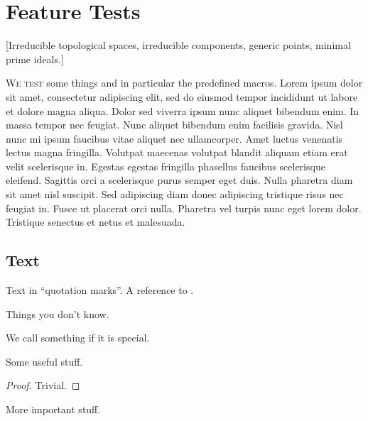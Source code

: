 \chapter{Feature Tests}

[Irreducible topological spaces, irreducible components, generic points, minimal prime ideals.]

\lettrine{W}{e test} some things and in particular the predefined macros.
Lorem ipsum dolor sit amet, consectetur adipiscing elit, sed do eiusmod tempor incididunt ut labore et dolore magna aliqua. Dolor sed viverra ipsum nunc aliquet bibendum enim. In massa tempor nec feugiat. Nunc aliquet bibendum enim facilisis gravida. Nisl nunc mi ipsum faucibus vitae aliquet nec ullamcorper. Amet luctus venenatis lectus magna fringilla. Volutpat maecenas volutpat blandit aliquam etiam erat velit scelerisque in. Egestas egestas fringilla phasellus faucibus scelerisque eleifend. Sagittis orci a scelerisque purus semper eget duis. Nulla pharetra diam sit amet nisl suscipit. Sed adipiscing diam donec adipiscing tristique risus nec feugiat in. Fusce ut placerat orci nulla. Pharetra vel turpis nunc eget lorem dolor. Tristique senectus et netus et malesuada.





\section{Text}

Text in \enquote{quotation marks}.
A reference to \cite{lee}.

\begin{recall}
  Things you don’t know.
\end{recall}

\begin{definition}
  We call something  if it is special.
\end{definition}

\begin{lemma}
  \label{generic lemma}
  Some useful stuff.
\end{lemma}

\begin{proof}
  Trivial.
\end{proof}

\begin{proposition}
  \label{generic proposition}
  More important stuff.
\end{proposition}

